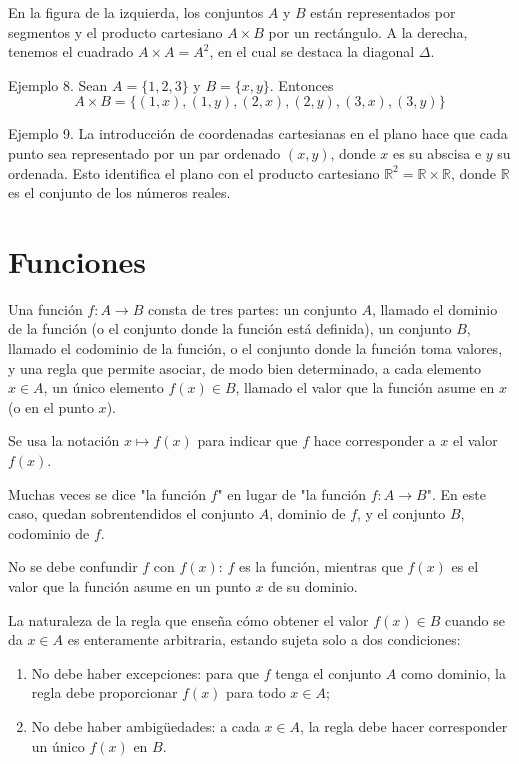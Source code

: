 \documentclass[12pt,oneside]{book}
\begin{document}
En la figura de la izquierda, los conjuntos \(A\) y \(B\) están representados por segmentos y el producto cartesiano \(A \times B\) por un rectángulo. A la derecha, tenemos el cuadrado \(A \times A = A^2\), en el cual se destaca la diagonal \(\Delta\).

Ejemplo 8. Sean \(A = \{1, 2, 3\}\) y \(B = \{x, y\}\). Entonces  
\[A \times B = \{(1, x), (1, y), (2, x), (2, y), (3, x), (3, y)\}\]

Ejemplo 9. La introducción de coordenadas cartesianas en el plano hace que cada punto sea representado por un par ordenado \((x, y)\), donde \(x\) es su abscisa e \(y\) su ordenada. Esto identifica el plano con el producto cartesiano \(\mathbb{R}^2 = \mathbb{R} \times \mathbb{R}\), donde \(\mathbb{R}\) es el conjunto de los números reales.

\section{Funciones}

Una función \(f: A \to B\) consta de tres partes: un conjunto \(A\), llamado el dominio de la función (o el conjunto donde la función está definida), un conjunto \(B\), llamado el codominio de la función, o el conjunto donde la función toma valores, y una regla que permite asociar, de modo bien determinado, a cada elemento \(x \in A\), un único elemento \(f(x) \in B\), llamado el valor que la función asume en \(x\) (o en el punto \(x\)).

Se usa la notación \(x \mapsto f(x)\) para indicar que \(f\) hace corresponder a \(x\) el valor \(f(x)\).

Muchas veces se dice "la función \(f\)" en lugar de "la función \(f: A \to B\)". En este caso, quedan sobrentendidos el conjunto \(A\), dominio de \(f\), y el conjunto \(B\), codominio de \(f\).

No se debe confundir \(f\) con \(f(x)\): \(f\) es la función, mientras que \(f(x)\) es el valor que la función asume en un punto \(x\) de su dominio.

La naturaleza de la regla que enseña cómo obtener el valor \(f(x) \in B\) cuando se da \(x \in A\) es enteramente arbitraria, estando sujeta solo a dos condiciones:

\begin{enumerate}
\item No debe haber excepciones: para que \(f\) tenga el conjunto \(A\) como dominio, la regla debe proporcionar \(f(x)\) para todo \(x \in A\);

\item No debe haber ambigüedades: a cada \(x \in A\), la regla debe hacer corresponder un único \(f(x)\) en \(B\).
\end{enumerate}
\end{document}
